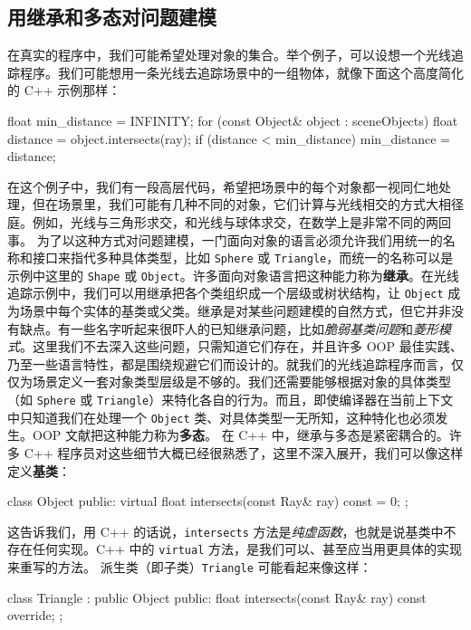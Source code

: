 \subsection{用继承和多态对问题建模}
\label{idx:idx_9b31be70}
在真实的程序中，我们可能希望处理对象的集合。举个例子，可以设想一个光线追踪程序。我们可能想用一条光线去追踪场景中的一组物体，就像下面这个高度简化的 C++ 示例那样：
\begin{codebox}[rust]
float min_distance = INFINITY;
for (const Object& object : sceneObjects) {
      float distance = object.intersects(ray);
      if (distance < min_distance) {
            min_distance = distance;
      }
}
\end{codebox}
在这个例子中，我们有一段高层代码，希望把场景中的每个对象都一视同仁地处理，但在场景里，我们可能有几种不同的对象，它们计算与光线相交的方式大相径庭。例如，光线与三角形求交，和光线与球体求交，在数学上是非常不同的两回事。
\label{idx:idx_8cfb499d}
\label{idx:idx_b95108a6}
\label{idx:idx_11753229}
\label{idx:idx_a1dce83e}
为了以这种方式对问题建模，一门面向对象的语言必须允许我们用统一的名称和接口来指代多种具体类型，比如 \texttt{Sphere} 或 \texttt{Triangle}，而统一的名称可以是示例中这里的 \texttt{Shape} 或 \texttt{Object}。许多面向对象语言把这种能力称为\textbf{继承}。在光线追踪示例中，我们可以用继承把各个类组织成一个层级或树状结构，让 \texttt{Object} 成为场景中每个实体的基类或父类。继承是对某些问题建模的自然方式，但它并非没有缺点。有一些名字听起来很吓人的已知继承问题，比如\emph{脆弱基类问题}和\emph{菱形模式}。这里我们不去深入这些问题，只需知道它们存在，并且许多 OOP 最佳实践、乃至一些语言特性，都是围绕规避它们而设计的。就我们的光线追踪程序而言，仅仅为场景定义一套对象类型层级是不够的。我们还需要能够根据对象的具体类型（如 \texttt{Sphere} 或 \texttt{Triangle}）来特化各自的行为。而且，即使编译器在当前上下文中只知道我们在处理一个 \texttt{Object} 类、对具体类型一无所知，这种特化也必须发生。OOP 文献把这种能力称为\textbf{多态}。
在 C++ 中，继承与多态是紧密耦合的。许多 C++ 程序员对这些细节大概已经很熟悉了，这里不深入展开，我们可以像这样定义\textbf{基类}：
\begin{codebox}[rust]
class Object {
public:
      virtual float intersects(const Ray& ray) const = 0;
};
\end{codebox}
\label{idx:idx_77fa9122}
这告诉我们，用 C++ 的话说，\texttt{intersects} 方法是\emph{纯虚函数}，也就是说基类中不存在任何实现。C++ 中的 \texttt{virtual} 方法，是我们可以、甚至应当用更具体的实现来重写的方法。
派生类（即子类）\texttt{Triangle} 可能看起来像这样：
\begin{codebox}[rust]
class Triangle : public Object {
public:
      float intersects(const Ray& ray) const override;
};
\end{codebox}
